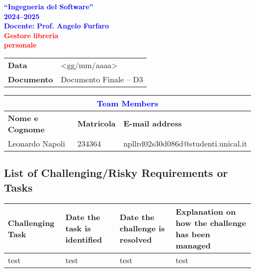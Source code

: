 \documentclass[a4paper,12pt]{report}
\begin{document}
\begin{titlepage}
  \begin{center}
    \thispagestyle{title}
    \vspace*{1.5cm}

    \begin{center}
      {\LARGE \textbf{\textcolor{blue}{``Ingegneria del Software''}}}\\[0.3cm]
      {\LARGE \textbf{\textcolor{blue}{2024--2025}}}\\[1cm]
      {\normalsize \textbf{\textcolor{blue}{Docente: Prof. Angelo Furfaro}}}\\[1.2cm]
      {\Huge \textbf{\textcolor{red}{Gestore libreria}}}\\[0.3cm]
      {\Huge \textbf{\textcolor{red}{personale}}}
    \end{center}

    \vspace*{1.5cm}

    \noindent
    \begin{tabular}{|>{\bfseries}p{3cm}|p{12cm}|}
      \hline
      Data & <gg/mm/aaaa> \\
      Documento & Documento Finale -- D3 \\
      \hline
    \end{tabular}

    \vspace*{0.5cm}


    \begin{tabular}{|l|l|l|}
      \hline
      \multicolumn{3}{|c|}{\large \textbf{\textcolor{blue}{Team Members}}} \\
      \hline
      \textbf{Nome e Cognome} & \textbf{Matricola} & \textbf{E-mail address} \\
      \hline
      Leonardo Napoli & 234364 & npllrd02s30d086d@studenti.unical.it \\
      \hline
    \end{tabular}
  \end{center}
\end{titlepage}

\tableofcontents
\newpage
\pagestyle{plain}
\subsection{List of Challenging/Risky Requirements or Tasks}\label{list-of-challengingrisky-requirements-or-tasks}

\begin{tabularx}{\textwidth}{|X|X|X|X|}
  \hline
  \textbf{Challenging Task}&
  \textbf{Date the task is identified}&
  \textbf{Date the challenge is resolved}&
  \textbf{Explanation on how the challenge has been managed} \\
  \hline
  test & test & test & test \\
  \hline
\end{tabularx}
\end{document}
